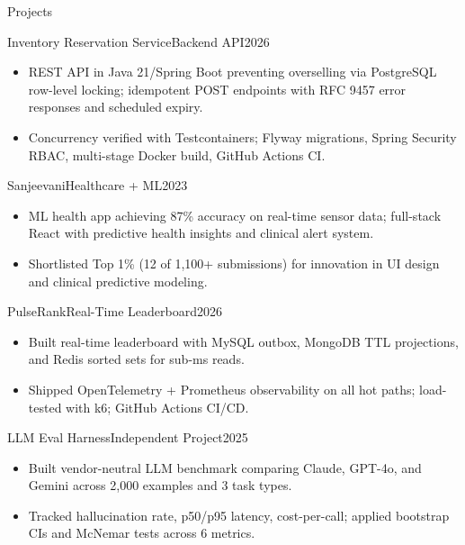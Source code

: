 \documentclass[]{mcdowellcv}
\begin{document}
\begin{cvsection}{Projects}
  \begin{cvsubsection}{Inventory Reservation Service}{Backend API}{2026}
    \begin{itemize}
      \item REST API in Java 21/Spring Boot preventing overselling via PostgreSQL row-level locking; idempotent POST endpoints with RFC 9457 error responses and scheduled expiry.
      \item Concurrency verified with Testcontainers; Flyway migrations, Spring Security RBAC, multi-stage Docker build, GitHub Actions CI.
    \end{itemize}
    \vspace{-1.5pt}
  \end{cvsubsection}

  \begin{cvsubsection}{Sanjeevani}{Healthcare + ML}{2023}
    \begin{itemize}
      \item ML health app achieving 87\% accuracy on real-time sensor data; full-stack React with predictive health insights and clinical alert system.
      \item Shortlisted Top 1\% (12 of 1,100+ submissions) for innovation in UI design and clinical predictive modeling.
    \end{itemize}
    \vspace{-1.5pt}
  \end{cvsubsection}

  \begin{cvsubsection}{PulseRank}{Real-Time Leaderboard}{2026}
    \begin{itemize}
      \item Built real-time leaderboard with MySQL outbox, MongoDB TTL projections, and Redis sorted sets for sub-ms reads.
      \item Shipped OpenTelemetry + Prometheus observability on all hot paths; load-tested with k6; GitHub Actions CI/CD.
    \end{itemize}
    \vspace{-1.5pt}
  \end{cvsubsection}

  \begin{cvsubsection}{LLM Eval Harness}{Independent Project}{2025}
    \begin{itemize}
      \item Built vendor-neutral LLM benchmark comparing Claude, GPT-4o, and Gemini across 2,000 examples and 3 task types.
      \item Tracked hallucination rate, p50/p95 latency, cost-per-call; applied bootstrap CIs and McNemar tests across 6 metrics.
    \end{itemize}
  \end{cvsubsection}
\end{cvsection}
\end{document}
